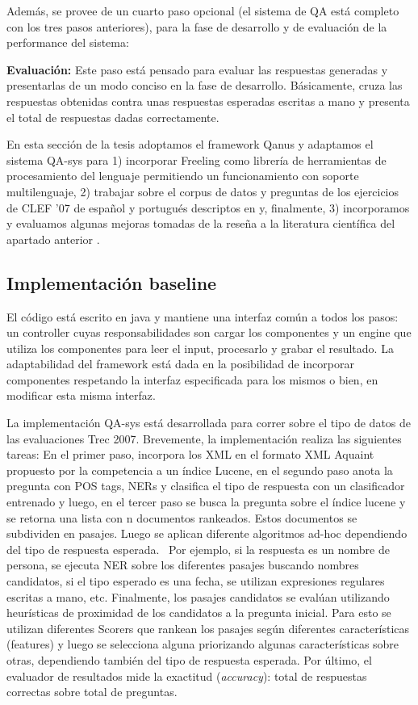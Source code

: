 Además, se provee de un cuarto paso opcional (el sistema de QA está
completo con los tres pasos anteriores), para la fase de desarrollo y
de evaluación de la performance del sistema:\newline


\textbf{Evaluación: }Este paso está pensado para evaluar las respuestas generadas y
presentarlas de un modo conciso en la fase de desarrollo.
Básicamente, cruza las respuestas obtenidas contra unas respuestas
esperadas escritas a mano y presenta el total de respuestas dadas
correctamente.\newline

En esta sección de la tesis adoptamos el framework Qanus y adaptamos el sistema QA-sys para 1) incorporar Freeling como librería de herramientas de procesamiento del lenguaje permitiendo un funcionamiento con soporte multilenguaje, 2) trabajar sobre el corpus de datos y preguntas de los ejercicios de CLEF '07 de español y portugués descriptos en  y, finalmente, 3) incorporamos y evaluamos algunas mejoras tomadas de la reseña a la literatura científica del apartado anterior .

\subsection{Implementación baseline}
\label{subsec:baseline}
El código está escrito en java y mantiene una interfaz común a
todos los pasos: un controller cuyas responsabilidades son cargar los
componentes y un engine que utiliza los componentes para leer el input,
procesarlo y grabar el resultado. La adaptabilidad del framework está
dada en la posibilidad de incorporar componentes respetando la interfaz
especificada para los mismos o bien, en modificar esta misma interfaz.

La implementación QA-sys está desarrollada para correr sobre
el tipo de datos de las evaluaciones Trec 2007.
Brevemente, la implementación realiza las siguientes tareas:
En el primer paso, incorpora los XML en el formato XML Aquaint propuesto por la competencia a un índice Lucene, en
el segundo paso anota la pregunta con POS tags, NERs y
clasifica el tipo de respuesta con un clasificador entrenado y luego,
en el tercer paso se busca la pregunta sobre el índice lucene y se
retorna una lista con n documentos rankeados. Estos documentos se
subdividen en pasajes. Luego se aplican diferente algoritmos ad-hoc
dependiendo del tipo de respuesta esperada. \ Por ejemplo, si la
respuesta es un nombre de persona, se ejecuta NER sobre los diferentes
pasajes buscando nombres candidatos, si el tipo esperado es una fecha,
se utilizan expresiones regulares escritas a mano, etc. Finalmente, los
pasajes candidatos se evalúan utilizando heurísticas de proximidad
de los candidatos a la pregunta inicial. Para esto se utilizan
diferentes Scorers que rankean los pasajes según diferentes
características (features) y luego se selecciona alguna priorizando
algunas características sobre otras, dependiendo también del tipo
de respuesta esperada. Por último, el evaluador de resultados mide la
exactitud (\textit{accuracy}): total de respuestas correctas sobre
total de preguntas.

